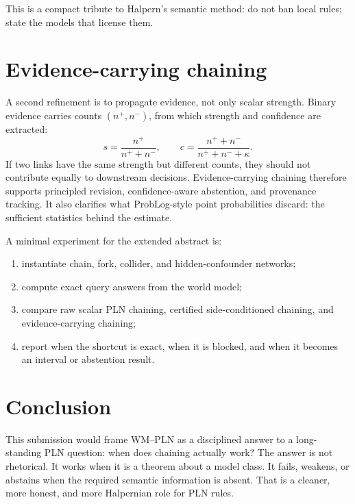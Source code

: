 \documentclass[11pt]{article}
\begin{document}
This is a compact tribute to Halpern's semantic method: do not ban local rules; state the models that license them.

\section{Evidence-carrying chaining}

A second refinement is to propagate evidence, not only scalar strength. Binary evidence carries counts $(n^+,n^-)$, from which strength and confidence are extracted:
\[
  s = \frac{n^+}{n^+ + n^-}, \qquad
  c = \frac{n^+ + n^-}{n^+ + n^- + \kappa}.
\]
If two links have the same strength but different counts, they should not contribute equally to downstream decisions. Evidence-carrying chaining therefore supports principled revision, confidence-aware abstention, and provenance tracking. It also clarifies what ProbLog-style point probabilities discard: the sufficient statistics behind the estimate.

A minimal experiment for the extended abstract is:
\begin{enumerate}
\item instantiate chain, fork, collider, and hidden-confounder networks;
\item compute exact query answers from the world model;
\item compare raw scalar PLN chaining, certified side-conditioned chaining, and evidence-carrying chaining;
\item report when the shortcut is exact, when it is blocked, and when it becomes an interval or abstention result.
\end{enumerate}

\section{Conclusion}

This submission would frame WM--PLN as a disciplined answer to a long-standing PLN question: when does chaining actually work? The answer is not rhetorical. It works when it is a theorem about a model class. It fails, weakens, or abstains when the required semantic information is absent. That is a cleaner, more honest, and more Halpernian role for PLN rules.
\end{document}
